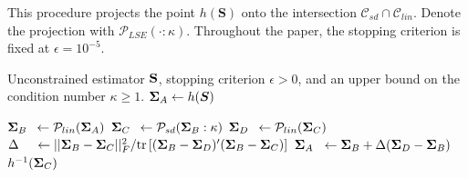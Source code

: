 \documentclass[11pt]{article}
\newcommand{\bLambda}{\boldsymbol{\lambda}}
\theoremstyle{definition}
\theoremstyle{definition}
\def\bSigma{{\bf \Sigma}}
\def\bLambda{{\bf \Lambda}}
\def\SS{{\bf S}}
\def\Tr{\text{tr}}
\begin{document}
\begin{algorithm}[t]
\caption{This procedure projects the point $h(\boldsymbol{S})$ onto the intersection $\mathcal{C}_{sd} \cap \mathcal{C}_{lin}$. Denote the projection with $\mathcal{P}_{LSE}(\cdot : \kappa)$. Throughout the paper, the stopping criterion is fixed at $\epsilon = 10^{-5}$.}
\label{proj_algo}
\begin{algorithmic}[1]
\Require Unconstrained estimator $\SS$, stopping criterion $\epsilon > 0$, and an upper bound on the condition number $\kappa \geq 1$. 
\State $\bSigma_{A} \leftarrow  h(\boldsymbol{S})$
\Repeat

\State $\bSigma_{B} \hspace{0.5em} \leftarrow \mathcal{P}_{lin}(\bSigma_{A})$
\State $\bSigma_{C} \hspace{0.5em} \leftarrow \mathcal{P}_{sd}(\bSigma_{B}: \kappa)$
\State $\bSigma_{D} \hspace{0.5em} \leftarrow \mathcal{P}_{lin}(\bSigma_{C})$
\State $\Delta \hspace{1.2em}\leftarrow ||\bSigma_{B} - \bSigma_{C}||_F^2 / \Tr\left[(\bSigma_{B}-\bSigma_{D})' (\bSigma_{B}-\bSigma_{C} )\right]$
\State $\bSigma_{A} \hspace{0.6em} \leftarrow \bSigma_{B} + \Delta(\bSigma_{D}-\bSigma_{B})$
\Until{$\max \left\{\left(\bSigma_{D}-\bSigma_{C}\right)_{ij}^2\right\} < \epsilon$}
\State
\Return $h^{-1}(\bSigma_{C})$
\EndProcedure
\end{algorithmic}
\label{algo}
\end{algorithm}
\end{document}
